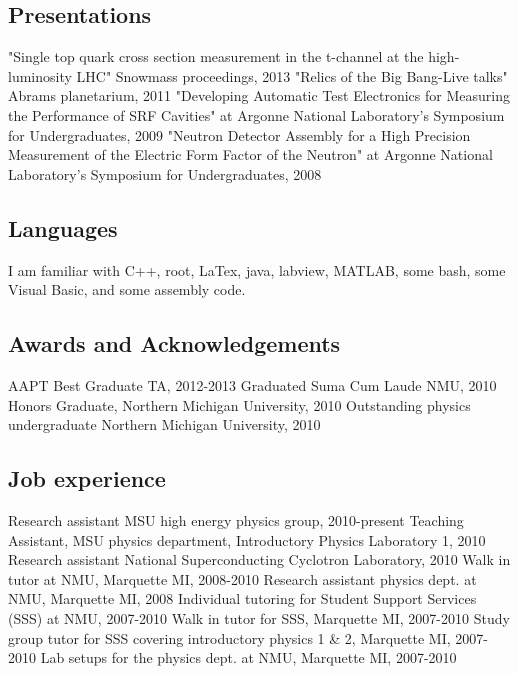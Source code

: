 \documentclass{article}
\begin{document}
\subsection{Presentations}
\hspace{0.5cm}"Single top quark cross section measurement in the t-channel at the high-luminosity LHC" Snowmass proceedings, 2013
"Relics of the Big Bang-Live talks" Abrams planetarium, 2011
"Developing Automatic Test Electronics for Measuring the Performance of SRF Cavities" at Argonne National Laboratory’s Symposium for Undergraduates, 2009
"Neutron Detector Assembly for a High Precision Measurement of the Electric Form Factor of the Neutron" at Argonne National Laboratory’s Symposium for Undergraduates, 2008
\subsection{Languages}
\hspace{0.5cm}I am familiar with C++, root, LaTex, java, labview, MATLAB, some bash, some Visual Basic, and some assembly code. 
\subsection{Awards and Acknowledgements}
\hspace{0.5cm}AAPT Best Graduate TA, 2012-2013
Graduated Suma Cum Laude NMU, 2010
Honors Graduate, Northern Michigan University, 2010
Outstanding physics undergraduate Northern Michigan University, 2010
\subsection{Job experience}
\hspace{0.5cm}Research assistant MSU high energy physics group, 2010-present
Teaching Assistant, MSU physics department, Introductory Physics Laboratory 1, 2010
Research assistant National Superconducting Cyclotron Laboratory, 2010
Walk in tutor at NMU, Marquette MI, 2008-2010
Research assistant physics dept. at NMU, Marquette MI, 2008
Individual tutoring for Student Support Services (SSS) at NMU, 2007-2010
Walk in tutor for SSS, Marquette MI, 2007-2010
Study group tutor for SSS covering introductory physics 1 \& 2, Marquette MI, 2007-2010
Lab setups for the physics dept. at NMU, Marquette MI, 2007-2010
\newpage
\end{document}
